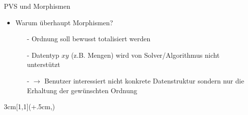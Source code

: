 \begin{frame}{PVS und Morphismen}
\begin{itemize}
\pause 
\item Warum überhaupt Morphismen?
\begin{itemize}
\item[-] Ordnung soll bewusst totalisiert werden
\item[-] Datentyp $xy$ (z.B. Mengen) wird von Solver/Algorithmus nicht unterstützt
\item[-] $\rightarrow$ Benutzer interessiert \alert{nicht} konkrete Datenstruktur sondern nur die Erhaltung der gewünschten Ordnung
\end{itemize}
\end{itemize}
%      
%
\begin{textblock*}{3cm}[1,1](\textwidth+.5cm,\textheight-5.3cm)
\begin{center}

\end{center}
\end{textblock*}
\end{frame}


